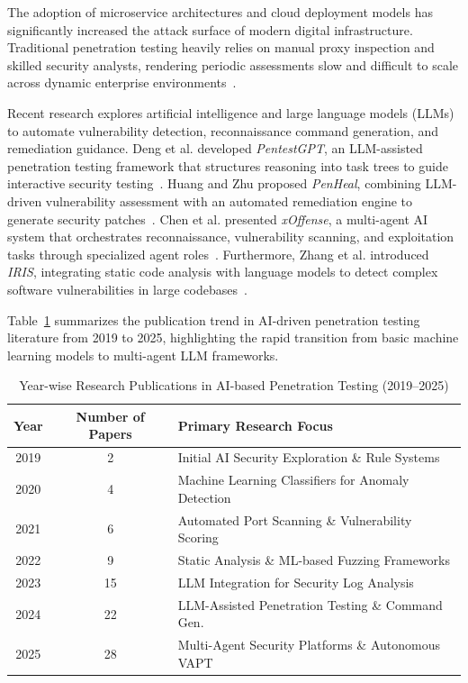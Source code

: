 \documentclass[journal]{IEEEtran}
\begin{document}
The adoption of microservice architectures and cloud deployment models has significantly increased the attack surface of modern digital infrastructure. Traditional penetration testing heavily relies on manual proxy inspection and skilled security analysts, rendering periodic assessments slow and difficult to scale across dynamic enterprise environments~\cite{mcgraw2006software,mahmoud2018network}.

Recent research explores artificial intelligence and large language models (LLMs) to automate vulnerability detection, reconnaissance command generation, and remediation guidance. Deng et al. developed \textit{PentestGPT}, an LLM-assisted penetration testing framework that structures reasoning into task trees to guide interactive security testing~\cite{deng2024pentestgpt}. Huang and Zhu proposed \textit{PenHeal}, combining LLM-driven vulnerability assessment with an automated remediation engine to generate security patches~\cite{huang2024penheal}. Chen et al. presented \textit{xOffense}, a multi-agent AI system that orchestrates reconnaissance, vulnerability scanning, and exploitation tasks through specialized agent roles~\cite{chen2025xoffense}. Furthermore, Zhang et al. introduced \textit{IRIS}, integrating static code analysis with language models to detect complex software vulnerabilities in large codebases~\cite{zhang2024iris}.

Table~\ref{tab:years} summarizes the publication trend in AI-driven penetration testing literature from 2019 to 2025, highlighting the rapid transition from basic machine learning models to multi-agent LLM frameworks.

\begin{table}[!t]
\centering
\caption{Year-wise Research Publications in AI-based Penetration Testing (2019--2025)}
\label{tab:years}
\begin{tabular}{c c l}
\toprule
\textbf{Year} & \textbf{Number of Papers} & \textbf{Primary Research Focus} \\
\midrule
2019 & 2 & Initial AI Security Exploration \& Rule Systems \\
2020 & 4 & Machine Learning Classifiers for Anomaly Detection \\
2021 & 6 & Automated Port Scanning \& Vulnerability Scoring \\
2022 & 9 & Static Analysis \& ML-based Fuzzing Frameworks \\
2023 & 15 & LLM Integration for Security Log Analysis \\
2024 & 22 & LLM-Assisted Penetration Testing \& Command Gen. \\
2025 & 28 & Multi-Agent Security Platforms \& Autonomous VAPT \\
\bottomrule
\end{tabular}
\end{table}
\end{document}
